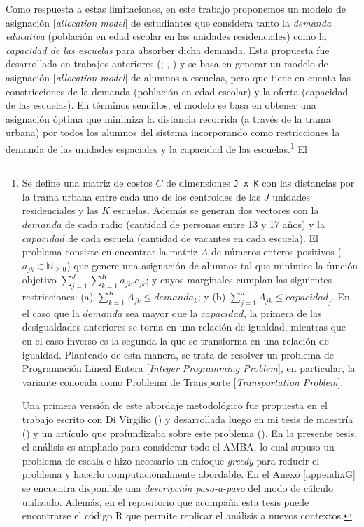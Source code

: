 \documentclass[
  spanish,
  a4paper,%
  chapterprefix=true,%
  DIV=calc,%
  twoside]{scrbook}%
\newcommand{\passthrough}[1]{#1}
\begin{document}
Como respuesta a estas limitaciones, en este trabajo proponemos un
modelo de asignación {[}\emph{allocation model}{]} de estudiantes que considera
tanto la \emph{demanda educativa} (población en edad escolar en las unidades
residenciales) como la \emph{capacidad de las escuelas} para absorber dicha
demanda. Esta propuesta fue desarrollada en trabajos anteriores
(; , ) y se basa en generar un
modelo de asignación {[}\emph{allocation model}{]} de alumnos a escuelas, pero
que tiene en cuenta las constricciones de la demanda (población en edad
escolar) y la oferta (capacidad de las escuelas). En términos sencillos,
el modelo se basa en obtener una asignación óptima que minimiza la
distancia recorrida (a través de la trama urbana) por todos los alumnos
del sistema incorporando como restricciones la demanda de las unidades
espaciales y la capacidad de las escuelas.\footnote{Se define una matriz de costos \(C\) de
  dimensiones \passthrough{\lstinline!J x K!} con las distancias por la trama urbana entre
  cada uno de los centroides de las \(J\) unidades residenciales y las
  \(K\) escuelas. Además se generan dos vectores con la \({demanda}\) de
  cada radio (cantidad de personas entre 13 y 17 años) y la
  \({capacidad}\) de cada escuela (cantidad de vacantes en cada
  escuela). El problema consiste en encontrar la matriz \(A\) de números
  enteros positivos (\(a_{jk} \in \mathbb{N}_{\geq 0}\)) que genere una
  asignación de alumnos tal que minimice la función objetivo
  \(\sum_{j=1}^J \sum_{k=1}^K a_{jk} . c_{jk}\); y cuyos marginales
  cumplan las siguientes restricciones: (a)
  \(\sum_{k=1}^K A_{j k} \leq {demanda}_k\); y (b)
  \(\sum_{j=1}^J A_{j k} \leq {capacidad}_j\). En el caso que la
  \({demanda}\) sea mayor que la \({capacidad}\), la primera de las
  desigualdades anteriores se torna en una relación de igualdad,
  mientras que en el caso inverso es la segunda la que se transforma
  en una relación de igualdad. Planteado de esta manera, se trata de
  resolver un problema de Programación Lineal Entera {[}\emph{Integer
  Programming Problem}{]}, en particular, la variante conocida como
  Problema de Transporte {[}\emph{Transportation Problem}{]}.

  Una primera versión de este abordaje metodológico fue propuesta en
  el trabajo escrito con Di Virgilio () y desarrollada
  luego en mi tesis de maestría () y un artículo que
  profundizaba sobre este problema (). En la presente
  tesis, el análisis es ampliado para considerar todo el AMBA, lo cual
  supuso un problema de escala e hizo necesario un enfoque \emph{greedy}
  para reducir el problema y hacerlo computacionalmente abordable. En
  el Anexo \ref{appendixG} se encuentra disponible una \emph{descripción
  paso-a-paso} del modo de cálculo utilizado. Además, en el
  repositorio que acompaña esta tesis puede encontrarse el código R
  que permite replicar el análisis a nuevos contextos.} El
\end{document}
